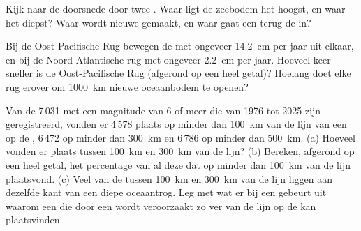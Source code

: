 \begin{exercise}[$\star\star$]\label{exo:g7:plate-tectonics:10}
Kijk naar de doorsnede door twee . Waar ligt de zeebodem het
hoogst, en waar het diepst? Waar wordt nieuwe  gemaakt, en waar gaat
een  terug de  in?
\end{exercise}

\begin{exercise}[$\star\star\star$]\label{exo:g7:plate-tectonics:11}
Bij de Oost-Pacifische Rug bewegen de  met ongeveer \qty{14.2}{cm}
per jaar uit elkaar, en bij de Noord-Atlantische rug met ongeveer
\qty{2.2}{cm} per jaar. Hoeveel keer sneller is de Oost-Pacifische Rug
(afgerond op een heel getal)? Hoelang doet elke rug erover om
\qty{1000}{km} nieuwe oceaanbodem te openen?
\end{exercise}

\begin{exercise}[$\star\star\star$]\label{exo:g7:plate-tectonics:12}
Van de 7\,031  met een magnitude van 6 of meer die van 1976 tot
2025 zijn geregistreerd, vonden er 4\,578 plaats op minder dan
\qty{100}{km} van de lijn van een  op de , 6\,472 op minder
dan \qty{300}{km} en 6\,786 op minder dan \qty{500}{km}.
(a) Hoeveel vonden er plaats tussen \qty{100}{km} en \qty{300}{km} van de
lijn? (b) Bereken, afgerond op een heel getal, het percentage van al deze
 dat op minder dan \qty{100}{km} van de lijn plaatsvond.
(c) Veel van de  tussen \qty{100}{km} en \qty{300}{km} van de
lijn liggen aan dezelfde kant van een diepe oceaantrog. Leg met wat er bij
een  gebeurt uit waarom een  die door een
 wordt veroorzaakt zo ver van de lijn op de  kan
plaatsvinden.
\end{exercise}

